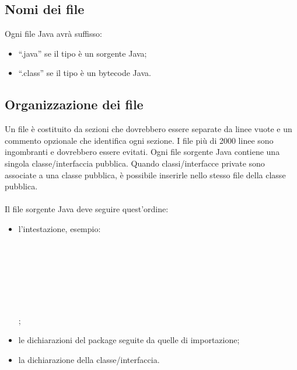 \subsection{Nomi dei file}
Ogni file Java avr\`a suffisso:
\begin{itemize}
  \item ``.java'' se il tipo \`e un sorgente Java;
  \item ``.class'' se il tipo \`e un bytecode Java.
\end{itemize}

\subsection{Organizzazione dei file}
Un file \`e costituito da sezioni che dovrebbero essere separate da linee vuote e
un commento opzionale che identifica ogni sezione. I file pi\`u di 2000 linee sono
ingombranti e dovrebbero essere evitati.
Ogni file sorgente Java contiene una singola classe/interfaccia pubblica.
Quando classi/interfacce private sono associate a una classe pubblica,
\`e possibile inserirle nello stesso file della classe pubblica.
\\ \\
Il file sorgente Java deve seguire quest'ordine:
\begin{itemize}
  \item l'intestazione, esempio: \\
  \hspace*{0.5cm} \co{//} \\
  \hspace*{0.5cm}  \\
  \hspace*{0.5cm} \co{//} \\
  \hspace*{0.5cm}  \\
  \hspace*{0.5cm} \co{//} \\
  \hspace*{0.5cm}  \\
  \hspace*{0.5cm} \co{//} \\
  ;
  \item le dichiarazioni del package seguite da quelle di importazione;
  \item la dichiarazione della classe/interfaccia.
\end{itemize}

